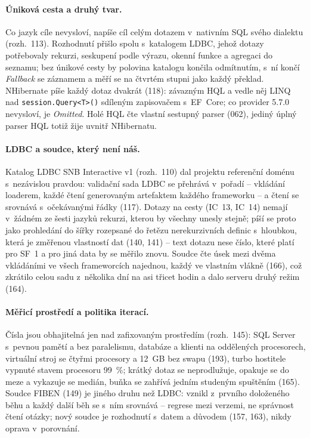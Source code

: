 \documentclass{article}
\begin{document}
\paragraph{Úniková cesta a druhý tvar.} Co jazyk cíle nevysloví, napíše cíl celým dotazem v~nativním SQL svého dialektu (rozh.~113). Rozhodnutí přišlo spolu s~katalogem LDBC, jehož dotazy potřebovaly rekurzi, seskupení podle výrazu, okenní funkce a agregaci do seznamu; bez únikové cesty by polovina katalogu končila odmítnutím, s~ní končí \emph{Fallback} se záznamem a měří se na čtvrtém stupni jako každý překlad. NHibernate píše každý dotaz dvakrát (118): závazným HQL a vedle něj LINQ nad \texttt{session.Query<T>()} sdíleným zapisovačem s~EF~Core; co provider 5.7.0 nevysloví, je \emph{Omitted}. Holé HQL čte vlastní sestupný parser (062), jediný úplný parser HQL totiž žije uvnitř NHibernatu.

\paragraph{LDBC a soudce, který není náš.} Katalog LDBC SNB Interactive v1 (rozh.~110) dal projektu referenční doménu s~nezávislou pravdou: validační sada LDBC se přehrává v~pořadí -- vkládání loaderem, každé čtení generovaným artefaktem každého frameworku -- a čtení se srovnává s~očekávanými řádky (117). Dotazy na cesty (IC~13, IC~14) nemají v~žádném ze šesti jazyků rekurzi, kterou by všechny unesly stejně; píší se proto jako prohledání do šířky rozepsané do řetězu nerekurzivních definic s~hloubkou, která je změřenou vlastností dat (140, 141) -- text dotazu nese číslo, které platí pro SF~1 a pro jiná data by se měřilo znovu. Soudce čte úsek mezi dvěma vkládáními ve všech frameworcích najednou, každý ve vlastním vlákně (166), což zkrátilo celou sadu z~několika dní na asi třicet hodin a dalo serveru druhý režim (164).

\paragraph{Měřicí prostředí a politika iterací.} Čísla jsou obhajitelná jen nad zafixovaným prostředím (rozh.~145): SQL Server s~pevnou pamětí a bez paralelismu, databáze a klienti na oddělených procesorech, virtuální stroj se čtyřmi procesory a 12~GB bez swapu (193), turbo hostitele vypnuté stavem procesoru 99~\%; krátký dotaz se neprodlužuje, opakuje se do meze a vykazuje se medián, buňka se zahřívá jedním studeným spuštěním (165). Soudce FIBEN (149) je jiného druhu než LDBC: vznikl z~prvního doloženého běhu a každý další běh se s~ním srovnává -- regrese mezi verzemi, ne správnost čtení otázky; nový soudce je rozhodnutí s~datem a důvodem (157, 163), nikdy oprava v~porovnání.
\end{document}
